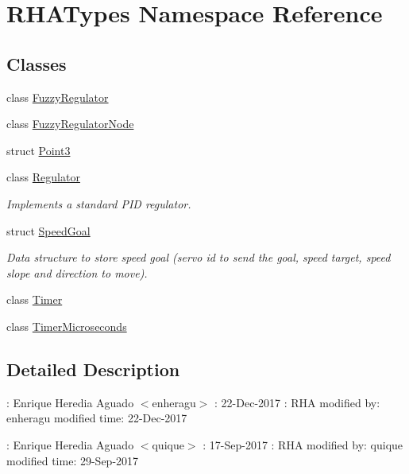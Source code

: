 \hypertarget{namespaceRHATypes}{}\section{R\+H\+A\+Types Namespace Reference}
\label{namespaceRHATypes}
\subsection*{Classes}
\begin{DoxyCompactItemize}
\item 
class \hyperlink{classRHATypes_1_1FuzzyRegulator}{Fuzzy\+Regulator}
\item 
class \hyperlink{classRHATypes_1_1FuzzyRegulatorNode}{Fuzzy\+Regulator\+Node}
\item 
struct \hyperlink{structRHATypes_1_1Point3}{Point3}
\item 
class \hyperlink{classRHATypes_1_1Regulator}{Regulator}
\begin{DoxyCompactList}\small\item\em Implements a standard P\+ID regulator. \end{DoxyCompactList}\item 
struct \hyperlink{structRHATypes_1_1SpeedGoal}{Speed\+Goal}
\begin{DoxyCompactList}\small\item\em Data structure to store speed goal (servo id to send the goal, speed target, speed slope and direction to move). \end{DoxyCompactList}\item 
class \hyperlink{classRHATypes_1_1Timer}{Timer}
\item 
class \hyperlink{classRHATypes_1_1TimerMicroseconds}{Timer\+Microseconds}
\end{DoxyCompactItemize}


\subsection{Detailed Description}
\+: Enrique Heredia Aguado $<$enheragu$>$ \+: 22-\/\+Dec-\/2017 \+: R\+HA  modified by\+: enheragu  modified time\+: 22-\/\+Dec-\/2017

\+: Enrique Heredia Aguado $<$quique$>$ \+: 17-\/\+Sep-\/2017 \+: R\+HA  modified by\+: quique  modified time\+: 29-\/\+Sep-\/2017 